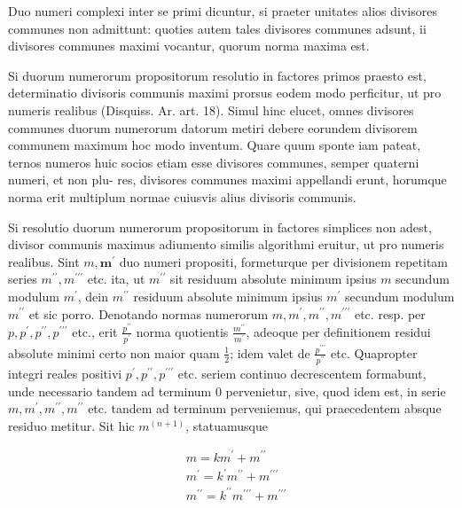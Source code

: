 \documentclass[10pt]{article}
\begin{document}
Duo numeri complexi inter se primi dicuntur, si praeter unitates alios divisores communes non admittunt: quoties autem tales divisores communes adsunt, ii divisores communes maximi vocantur, quorum norma maxima est.

Si duorum numerorum propositorum resolutio in factores primos praesto est, determinatio divisoris communis maximi prorsus eodem modo perficitur, ut pro numeris realibus (Disquiss. Ar. art. 18). Simul hinc elucet, omnes divisores communes duorum numerorum datorum metiri debere eorundem divisorem communem maximum hoc modo inventum. Quare quum sponte iam pateat, ternos numeros huic socios etiam esse divisores communes, semper quaterni numeri, et non plu-
res, divisores communes maximi appellandi erunt, horumque norma erit multiplum normae cuiusvis alius divisoris communis.

Si resolutio duorum numerorum propositorum in factores simplices non adest, divisor communis maximus adiumento similis algorithmi eruitur, ut pro numeris realibus. Sint \(m, \boldsymbol{m}^{\prime}\) duo numeri propositi, formeturque per divisionem repetitam series \(m^{\prime \prime}, m^{\prime \prime \prime}\) etc. ita, ut \(m^{\prime \prime}\) sit residuum absolute minimum ipsius \(m\) secundum modulum \(m^{\prime}\), dein \(m^{\prime \prime}\) residuum absolute minimum ipsius \(m^{\prime}\) secundum modulum \(m^{\prime \prime}\) et sic porro. Denotando normas numerorum \(m, m^{\prime}, m^{\prime \prime}, m^{\prime \prime \prime}\) etc. resp. per \(p, p^{\prime}, p^{\prime \prime}, p^{\prime \prime \prime}\) etc., erit \(\frac{p^{\prime \prime}}{p^{\prime}}\) norma quotientis \(\frac{m^{\prime \prime}}{m^{\prime}}\), adeoque per definitionem residui absolute minimi certo non maior quam \(\frac{1}{2}\); idem valet de \(\frac{p^{\prime \prime \prime}}{p^{\prime \prime}}\) etc. Quapropter integri reales positivi \(p^{\prime}, p^{\prime \prime}, p^{\prime \prime \prime}\) etc. seriem continuo decrescentem formabunt, unde necessario tandem ad terminum 0 pervenietur, sive, quod idem est, in serie \(m, m^{\prime}, m^{\prime \prime}, m^{\prime \prime}\) etc. tandem ad terminum perveniemus, qui praecedentem absque residuo metitur. Sit hic \(m^{(n+1)}\), statuamusque

\[
\begin{aligned}
& m=k m^{\prime}+m^{\prime \prime} \\
& m^{\prime}=k^{\prime} m^{\prime \prime}+m^{\prime \prime \prime} \\
& m^{\prime \prime}=k^{\prime \prime} m^{\prime \prime \prime}+m^{\prime \prime \prime}
\end{aligned}
\]
\end{document}

